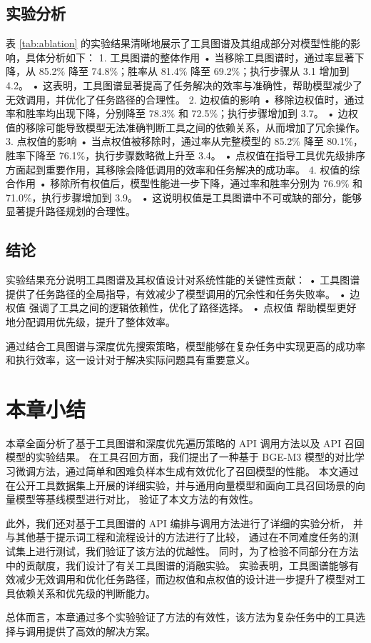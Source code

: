 \subsection{实验分析}

表 \ref{tab:ablation} 的实验结果清晰地展示了工具图谱及其组成部分对模型性能的影响，具体分析如下：
	1.	工具图谱的整体作用
	•	当移除工具图谱时，通过率显著下降，从 85.2\% 降至 74.8\%；胜率从 81.4\% 降至 69.2\%；执行步骤从 3.1 增加到 4.2。
	•	这表明，工具图谱显著提高了任务解决的效率与准确性，帮助模型减少了无效调用，并优化了任务路径的合理性。
	2.	边权值的影响
	•	移除边权值时，通过率和胜率均出现下降，分别降至 78.3\% 和 72.5\%；执行步骤增加到 3.7。
	•	边权值的移除可能导致模型无法准确判断工具之间的依赖关系，从而增加了冗余操作。
	3.	点权值的影响
	•	当点权值被移除时，通过率从完整模型的 85.2\% 降至 80.1\%，胜率下降至 76.1\%，执行步骤数略微上升至 3.4。
	•	点权值在指导工具优先级排序方面起到重要作用，其移除会降低调用的效率和任务解决的成功率。
	4.	权值的综合作用
	•	移除所有权值后，模型性能进一步下降，通过率和胜率分别为 76.9\% 和 71.0\%，执行步骤增加到 3.9。
	•	这说明权值是工具图谱中不可或缺的部分，能够显著提升路径规划的合理性。

\subsection{结论}

实验结果充分说明工具图谱及其权值设计对系统性能的关键性贡献：
	•	工具图谱 提供了任务路径的全局指导，有效减少了模型调用的冗余性和任务失败率。
	•	边权值 强调了工具之间的逻辑依赖性，优化了路径选择。
	•	点权值 帮助模型更好地分配调用优先级，提升了整体效率。

通过结合工具图谱与深度优先搜索策略，模型能够在复杂任务中实现更高的成功率和执行效率，这一设计对于解决实际问题具有重要意义。


\section{本章小结}

本章全面分析了基于工具图谱和深度优先遍历策略的 API 调用方法以及 API 召回模型的实验结果。
在工具召回方面，我们提出了一种基于 BGE-M3 模型的对比学习微调方法，通过简单和困难负样本生成有效优化了召回模型的性能。
本文通过在公开工具数据集上开展的详细实验，并与通用向量模型和面向工具召回场景的向量模型等基线模型进行对比，
验证了本文方法的有效性。

此外，我们还对基于工具图谱的 API 编排与调用方法进行了详细的实验分析，
并与其他基于提示词工程和流程设计的方法进行了比较，
通过在不同难度任务的测试集上进行测试，我们验证了该方法的优越性。
同时，为了检验不同部分在方法中的贡献度，我们设计了有关工具图谱的消融实验。
实验表明，工具图谱能够有效减少无效调用和优化任务路径，而边权值和点权值的设计进一步提升了模型对工具依赖关系和优先级的判断能力。

总体而言，本章通过多个实验验证了方法的有效性，该方法为复杂任务中的工具选择与调用提供了高效的解决方案。
